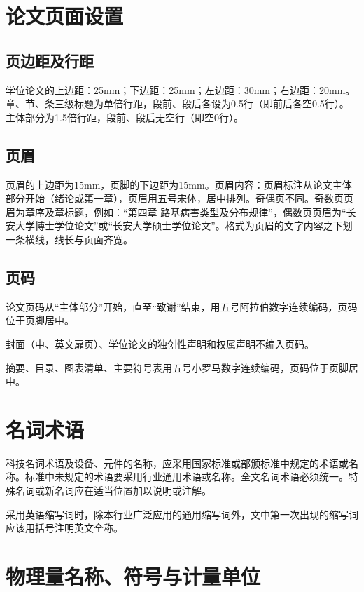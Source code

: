 \section{论文页面设置}

\subsection{页边距及行距}

学位论文的上边距：25mm；下边距：25mm；左边距：30mm；右边距：20mm。
章、节、条三级标题为单倍行距，段前、段后各设为0.5行（即前后各空0.5行）。
主体部分为1.5倍行距，段前、段后无空行（即空0行）。

\subsection{页眉}

页眉的上边距为15mm，页脚的下边距为15mm。页眉内容：页眉标注从论文主体部分开始（绪论或第一章），页眉用五号宋体，居中排列。奇偶页不同。奇数页页眉为章序及章标题，例如：“第四章  路基病害类型及分布规律”，偶数页页眉为“长安大学博士学位论文”或“长安大学硕士学位论文”。格式为页眉的文字内容之下划一条横线，线长与页面齐宽。

\subsection{页码}
论文页码从“主体部分”开始，直至“致谢”结束，用五号阿拉伯数字连续编码，页码位于页脚居中。

封面（中、英文扉页）、学位论文的独创性声明和权属声明不编入页码。

摘要、目录、图表清单、主要符号表用五号小罗马数字连续编码，页码位于页脚居中。

\section{名词术语}

科技名词术语及设备、元件的名称，应采用国家标准或部颁标准中规定的术语或名称。标准中未规定的术语要采用行业通用术语或名称。全文名词术语必须统一。特殊名词或新名词应在适当位置加以说明或注解。

采用英语缩写词时，除本行业广泛应用的通用缩写词外，文中第一次出现的缩写词应该用括号注明英文全称。

\section{物理量名称、符号与计量单位}


